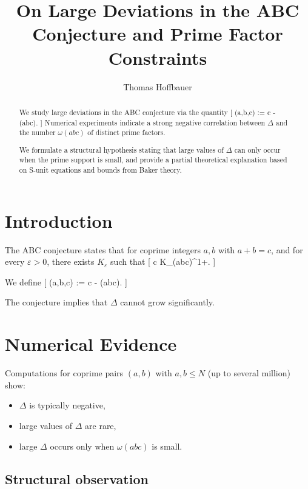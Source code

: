 \documentclass[11pt]{article}
\title{On Large Deviations in the ABC Conjecture and Prime Factor Constraints}
\author{Thomas Hoffbauer}
\date{}
\begin{document}
	\maketitle
	
	\begin{abstract}
		We study large deviations in the ABC conjecture via the quantity
		[
		\Delta(a,b,c) := \log c - \log {}(abc).
		]
		Numerical experiments indicate a strong negative correlation between $\Delta$
		and the number $\omega(abc)$ of distinct prime factors.
		
		We formulate a structural hypothesis stating that large values of $\Delta$
		can only occur when the prime support is small, and provide a partial
		theoretical explanation based on S-unit equations and bounds from
		Baker theory.
	\end{abstract}
	
	\section{Introduction}
	
	The ABC conjecture states that for coprime integers $a,b$ with $a+b=c$,
	and for every $\varepsilon>0$, there exists $K_\varepsilon$ such that
	[
	c \le K_\varepsilon \cdot {}(abc)^{1+\varepsilon}.
	]
	
	We define
	[
	\Delta(a,b,c) := \log c - \log {}(abc).
	]
	
	The conjecture implies that $\Delta$ cannot grow significantly.
	
	\section{Numerical Evidence}
	
	Computations for coprime pairs $(a,b)$ with $a,b \le N$ (up to several million)
	show:
	
	\begin{itemize}
		\item $\Delta$ is typically negative,
		\item large values of $\Delta$ are rare,
		\item large $\Delta$ occurs only when $\omega(abc)$ is small.
	\end{itemize}
	
	\subsection{Structural observation}
	
\end{document}

